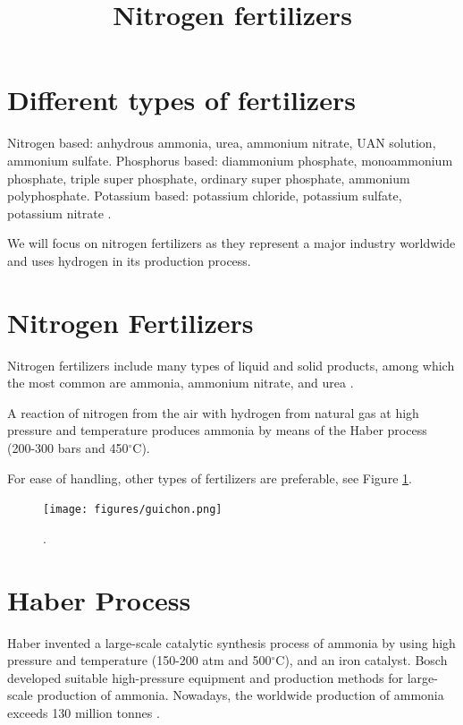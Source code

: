 \documentclass[11pt,letterpaper]{article}
\title{Nitrogen fertilizers}
\begin{document}

\section{Different types of fertilizers}
Nitrogen based: anhydrous ammonia, urea, ammonium nitrate, UAN solution, ammonium sulfate.
Phosphorus based: diammonium phosphate, monoammonium phosphate, triple super phosphate, ordinary super phosphate, ammonium polyphosphate.
Potassium based: potassium chloride, potassium sulfate, potassium nitrate \cite{hugh_savoy_fertilizers_2009}.

We will focus on nitrogen fertilizers as they represent a major industry worldwide \cite{guichon_valves_nitrogen_2020} and uses hydrogen in its production process.

\section{Nitrogen Fertilizers}
Nitrogen fertilizers include many types of liquid and solid products, among which the most common are ammonia, ammonium nitrate, and urea \cite{guichon_valves_nitrogen_2020}.

A reaction of nitrogen from the air with hydrogen from natural gas at high pressure and temperature produces ammonia by means of the Haber process (200-300 bars and 450$^{\circ}$C).

For ease of handling, other types of fertilizers are preferable, see Figure \ref{fig:nitrof}.

\begin{figure}[] %
	\centering
	\texttt{[image: figures/guichon.png]}
	\hfill
	\caption{\cite{guichon_valves_nitrogen_2020}.}
	\label{fig:nitrof}
\end{figure}

\section{Haber Process}
Haber invented a large-scale catalytic synthesis process of ammonia by using high pressure and temperature (150-200 atm and 500$^{\circ}$C), and an iron catalyst. Bosch developed suitable high-pressure equipment and production methods for large-scale production of ammonia.
Nowadays, the worldwide production of ammonia exceeds 130 million tonnes \cite{modak_haber_2011}.
\end{document}
